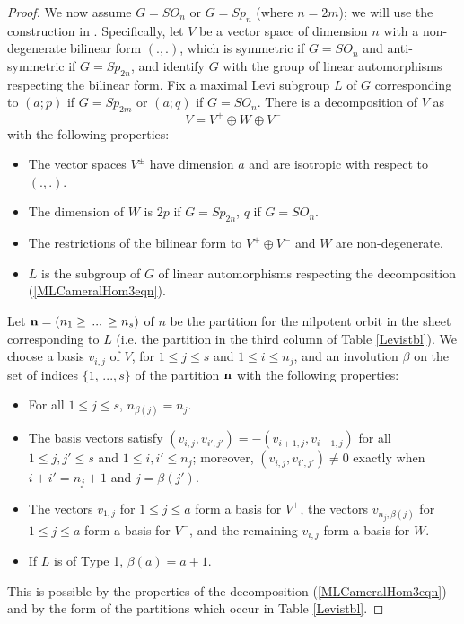 \documentclass{amsart}
\theoremstyle{remark}
\numberwithin{theorem}{section}
\numberwithin{equation}{section}
\begin{document}
\begin{proof}
We now assume $G = SO_n$ or $G=Sp_n$ (where $n=2m$); we will use the construction in \cite[Lemma 7.3]{Hesselink}. Specifically, let $V$ be a vector space of dimension $n$ with a non-degenerate bilinear form $(.,.)$, which is symmetric if $G=SO_n$ and anti-symmetric if $G=Sp_{2n}$, and identify $G$ with the group of linear automorphisms respecting the bilinear form. Fix a maximal Levi subgroup $L$ of $G$ corresponding to $(a;p)$ if $G=Sp_{2m}$ or $(a;q)$ if $G=SO_n$. There is a decomposition of $V$ as
\begin{equation}\label{MLCameralHom3eqn}
    V = V^+\oplus W \oplus V^-
\end{equation}
with the following properties:
\begin{itemize}
    \item The vector spaces $V^\pm$ have dimension $a$ and are isotropic with respect to $(.,.)$.
    \item The dimension of $W$ is $2p$ if $G=Sp_{2n}$, $q$ if $G=SO_n$.
    \item The restrictions of the bilinear form to $V^+ \oplus V^-$ and $W$ are non-degenerate.
    \item $L$ is the subgroup of $G$ of linear automorphisms respecting the decomposition (\ref{MLCameralHom3eqn}).
\end{itemize}

Let ${\bf n} = (n_1 \geq \,  ...\, \geq n_s)$ of $n$ be the partition for the nilpotent orbit in the sheet corresponding to $L$ (i.e. the partition in the third column of Table \ref{Levistbl}). We choose a basis $v_{i,j}$ of $V$, for $1 \leq j \leq s$ and $1\leq i \leq n_j$, and an involution $\beta$ on the set of indices $\{1,\, ..., s\}$ of the partition ${\bf n}$ with the following properties:
\begin{itemize}
    \item For all $1 \leq j \leq s$, $n_{\beta(j)} =n_j$.
    \item The basis vectors satisfy $(v_{i,j},v_{i',j'})=-(v_{i+1,j},v_{{i-1},j})$ for all $1\leq j, j'\leq s$ and $1\leq i,i' \leq n_j$; moreover, $(v_{i,j},v_{i',j'}) \neq 0$ exactly when $i+i' = n_j+1$ and $j = \beta(j')$.
    \item The vectors $v_{1,j}$ for $1 \leq j \leq a$ form a basis for $V^+$, the vectors $v_{n_j, \beta(j)}$ for $1 \leq j \leq a$ form a basis for $V^-$, and the remaining $v_{i,j}$ form a basis for $W$.
    \item If $L$ is of Type 1, $\beta(a) = a+1$.
\end{itemize}
This is possible by the properties of the decomposition (\ref{MLCameralHom3eqn}) and by the form of the partitions which occur in Table \ref{Levistbl}.


\end{proof}
\end{document}
